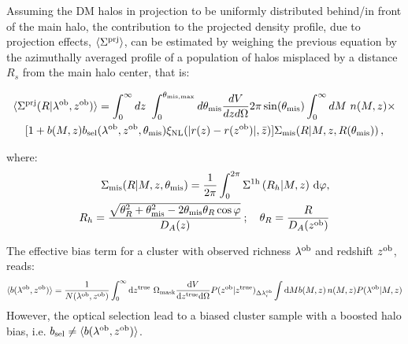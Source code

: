 \documentclass{article}
\newcommand{\de}{\text{d}}
\newcommand{\0}{\textup{0}}
\newcommand{\ob}{^{\rm ob}}
\newcommand{\true}{^{\rm true}}
\begin{document}
Assuming the DM halos in projection to be uniformly distributed behind/in front of the main halo, the contribution to the projected density profile, due to projection effects, $\langle \Sigma^{\rm prj} \rangle$, can be estimated by weighing the previous equation by the azimuthally averaged profile of a population of halos misplaced by a distance $R_s$ from the main halo center, that is:

\begin{multline}
    \langle \Sigma^{\rm prj} (R|\lambda^{\rm ob},z^{\rm ob}) \rangle = \int_0^{\infty} d z\ \int_0^{\theta_{\rm mis, max}} d \theta_{\rm mis}  \frac{d V}{d z d \Omega}
 2 \pi \sin(\theta_{\rm mis})  \int_0^{\infty} d M\ n(M,z) \times \\ [1 + b(M,z) b_{\rm sel}(\lambda^{\rm ob}, z^{\rm ob},\theta_{\rm mis}) \xi_{\rm NL}(|r(z)-r(z^{\rm ob})|,\bar{z})] \Sigma_{\rm mis} (R |M,z, R(\theta_{\rm mis})) \, ,
\end{multline}

where:
\begin{eqnarray}
 \Sigma_{\rm mis} (R |M,z,\theta_{\rm mis}) = \frac 1 {2 \pi} \int_0^{2 \pi} \Sigma^{\rm 1h}\left(R_h| M,z \right) \, {\rm d} \varphi, \\
 R_h = \frac{\sqrt{\theta_R^2+\theta_{\rm mis}^2-2\theta_{\rm mis}\theta_{R}\cos\varphi}}{D_A(z)} \, ; \quad \theta_R=\frac{R}{D_A(z^{\rm ob})} \nonumber
\end{eqnarray}

The effective bias term for a cluster with observed richness $\lambda\ob$ and redshift $z\ob$, reads:
\begin{equation}
\langle b (\lambda\ob, z\ob) \rangle = \frac{1}{N(\lambda\ob,z\ob)} \int_0^{\infty}  \de z\true\
  {\Omega_{\rm mask}} \frac{\de V}{\de z\true \de \Omega}  P(z\ob|z\true)_{\Delta\lambda\ob_i}
  \int \de M b(M,z)\, n(M,z) P(\lambda\ob | M,z)
\end{equation}
However, the optical selection lead to a biased cluster sample with a boosted halo bias, i.e. $b_{\rm sel} \neq \langle b (\lambda\ob, z\ob) \rangle$.
\end{document}
